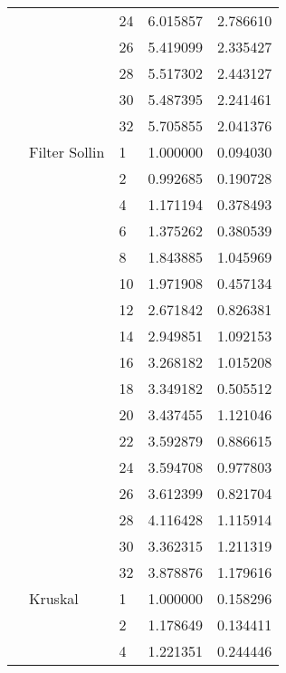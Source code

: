 \begin{tabular}{lllrr}
                      &            & 24 &  6.015857 &  2.786610 \\
                      &            & 26 &  5.419099 &  2.335427 \\
                      &            & 28 &  5.517302 &  2.443127 \\
                      &            & 30 &  5.487395 &  2.241461 \\
                      &            & 32 &  5.705855 &  2.041376 \\
                      & Filter Sollin & 1  &  1.000000 &  0.094030 \\
                      &            & 2  &  0.992685 &  0.190728 \\
                      &            & 4  &  1.171194 &  0.378493 \\
                      &            & 6  &  1.375262 &  0.380539 \\
                      &            & 8  &  1.843885 &  1.045969 \\
                      &            & 10 &  1.971908 &  0.457134 \\
                      &            & 12 &  2.671842 &  0.826381 \\
                      &            & 14 &  2.949851 &  1.092153 \\
                      &            & 16 &  3.268182 &  1.015208 \\
                      &            & 18 &  3.349182 &  0.505512 \\
                      &            & 20 &  3.437455 &  1.121046 \\
                      &            & 22 &  3.592879 &  0.886615 \\
                      &            & 24 &  3.594708 &  0.977803 \\
                      &            & 26 &  3.612399 &  0.821704 \\
                      &            & 28 &  4.116428 &  1.115914 \\
                      &            & 30 &  3.362315 &  1.211319 \\
                      &            & 32 &  3.878876 &  1.179616 \\
                      & Kruskal & 1  &  1.000000 &  0.158296 \\
                      &            & 2  &  1.178649 &  0.134411 \\
                      &            & 4  &  1.221351 &  0.244446 \\

\end{tabular}
